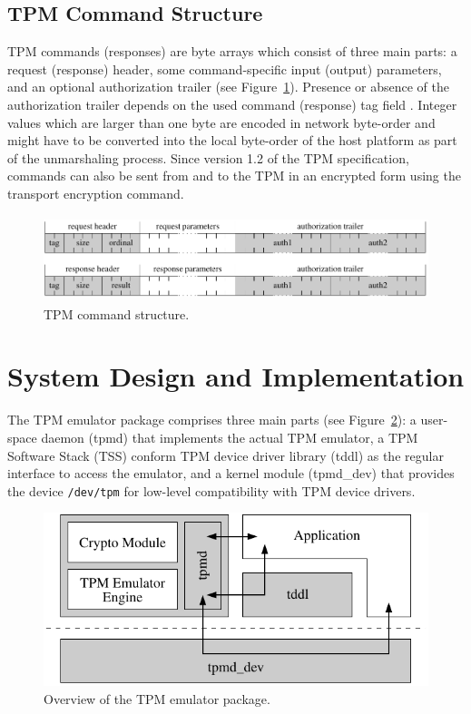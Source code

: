 \documentclass[runningheads]{llncs}
\newcommand{\file}[1]{\small\texttt{#1}\normalsize}
\begin{document}
\subsection{TPM Command Structure}
TPM commands (responses) are byte arrays which consist of three main parts: a request (response)
header, some command-specific input (output) parameters, and an optional authorization trailer
(see Figure~\ref{fig:tpm_command}). Presence or absence of the authorization trailer depends on the
used command (response) tag field . Integer values which are larger than one byte are encoded
in network byte-order and might have to be converted into the local byte-order of the host platform
as part of the unmarshaling process. Since version 1.2 of the TPM specification, commands can
also be sent from and to the TPM in an encrypted form using the transport encryption command.

\begin{figure}[h]
\centering
\includegraphics[height=25mm]{figures/tpm_command_structure}
\caption{TPM command structure.}
\label{fig:tpm_command}
\end{figure}

\section{System Design and Implementation}
The TPM emulator package comprises three main parts (see Figure~\ref{fig:system_overview}):
a user-space daemon (tpmd) that implements the actual TPM emulator, a TPM Software Stack (TSS)
conform TPM device driver library (tddl) as the regular interface to access the emulator, and a
kernel module (tpmd\_dev) that provides the device \file{/dev/tpm} for low-level compatibility
with TPM device drivers.

\begin{figure}[ht]
\centering
\includegraphics[width=.5\textwidth]{figures/system_overview}
\caption{Overview of the TPM emulator package.}
\label{fig:system_overview}
\end{figure}
\end{document}
